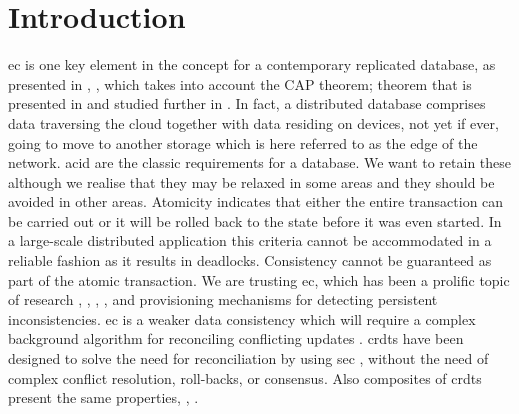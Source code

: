 \section{Introduction}
\gls{ec} is one key element in the concept for a contemporary replicated database, as presented in \cite{Shapiro2009a}, \cite{Saito2005a}, which takes into account the CAP theorem; theorem that is presented in \cite{Brewer2000cap} and studied further in \cite{Abadi2012consistency, Gilbert2002a}. In fact, a distributed database comprises data traversing the cloud together with data residing on devices, not yet if ever, going to move to another storage which is here referred to as the edge of the network. \gls{acid} are the classic requirements for a database. We want to retain these although we realise that they may be relaxed in some areas and they should be avoided in other areas. Atomicity indicates that either the entire transaction can be carried out or it will be rolled back to the state before it was even started. In a large-scale distributed application this criteria cannot be accommodated in a reliable fashion as it results in deadlocks. Consistency cannot be guaranteed as part of the atomic transaction. We are trusting \gls{ec}, which has been a prolific topic of research \cite{shapiro11comprehensive}, \cite{Vogels2009a}, \cite{Saito2005a}, \cite{Baquero1997a}, and provisioning mechanisms for detecting persistent inconsistencies. \gls{ec} is a weaker data consistency which will require a complex background algorithm for reconciling conflicting updates \cite{Terry1995a}. \glspl{crdt} have been designed to solve the need for reconciliation by using \gls{sec} \cite{shapiro11conflictfree}, without the need of complex conflict resolution, roll-backs, or consensus. Also composites of \glspl{crdt} present the same properties, \cite{Deftu2013a}, \cite{shapiro11comprehensive}.